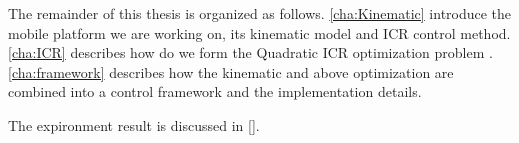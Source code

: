 The remainder of this thesis is organized as follows.
\cref{cha:Kinematic} introduce the mobile platform we are working on, its kinematic model and ICR control method.
\cref{cha:ICR} describes how do we form the Quadratic ICR optimization problem .
\cref{cha:framework} describes how the kinematic and above optimization are combined into a control framework and the implementation details.

The expironment result is discussed in \cref{}.